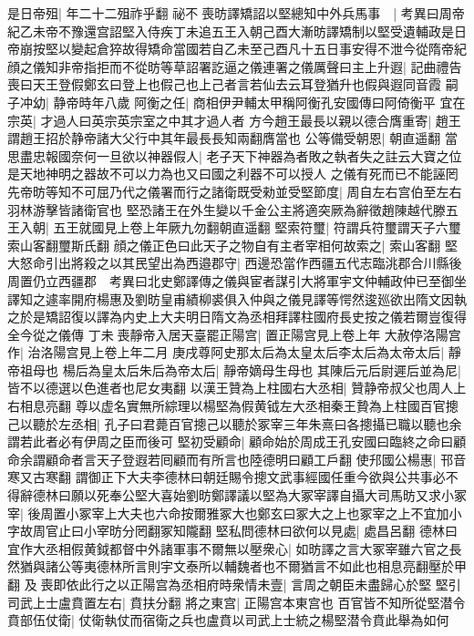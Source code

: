 是日帝殂|{
	年二十二殂祚乎翻}
祕不喪昉譯矯詔以堅總知中外兵馬事　|{
	考異曰周帝紀乙未帝不豫還宫詔堅入侍疾丁未追五王入朝己酉大漸昉譯矯制以堅受遺輔政是日帝崩按堅以變起倉猝故得矯命當國若自乙未至己酉凡十五日事安得不泄今從隋帝紀}
顔之儀知非帝指拒而不從昉等草詔署訖逼之儀連署之儀厲聲曰主上升遐|{
	記曲禮告喪曰天王登假鄭玄曰登上也假己也上己者言若仙去云耳登猶升也假與遐同音霞}
嗣子冲幼|{
	静帝時年八歲}
阿衡之任|{
	商相伊尹輔太甲稱阿衡孔安國傳曰阿倚衡平}
宜在宗英|{
	才過人曰英宗英宗室之中其才過人者}
方今趙王最長以親以德合膺重寄|{
	趙王謂趙王招於静帝諸大父行中其年最長長知兩翻膺當也}
公等備受朝恩|{
	朝直遥翻}
當思盡忠報國奈何一旦欲以神器假人|{
	老子天下神器為者敗之執者失之註云大寶之位是天地神明之器故不可以力為也又曰國之利器不可以授人}
之儀有死而已不能誣罔先帝昉等知不可屈乃代之儀署而行之諸衛既受勑並受堅節度|{
	周自左右宫伯至左右羽林游擊皆諸衛官也}
堅恐諸王在外生變以千金公主將適突厥為辭徵趙陳越代滕五王入朝|{
	五王就國見上卷上年厥九勿翻朝直遥翻}
堅索符璽|{
	符謂兵符璽謂天子六璽索山客翻璽斯氏翻}
顔之儀正色曰此天子之物自有主者宰相何故索之|{
	索山客翻}
堅大怒命引出將殺之以其民望出為西邉郡守|{
	西邊恐當作西疆五代志臨洮郡合川縣後周置仍立西疆郡　考異曰北史鄭譯傳之儀與宦者謀引大將軍宇文仲輔政仲已至御坐譯知之遽率開府楊惠及劉昉皇甫績柳裘俱入仲與之儀見譯等愕然逡廵欲出隋文因執之於是矯詔復以譯為内史上大夫明日隋文為丞相拜譯柱國府長史按之儀若爾豈復得全今從之儀傳}
丁未喪靜帝入居天臺罷正陽宫|{
	置正陽宫見上卷上年}
大赦停洛陽宫作|{
	治洛陽宫見上卷上年二月}
庚戌尊阿史那太后為太皇太后李太后為太帝太后|{
	靜帝祖母也}
楊后為皇太后朱后為帝太后|{
	靜帝嫡母生母也}
其陳后元后尉遲后並為尼|{
	皆不以德選以色進者也尼女夷翻}
以漢王贊為上柱國右大丞相|{
	贊静帝叔父也周人上右相息亮翻}
尊以虚名實無所綜理以楊堅為假黄钺左大丞相秦王贄為上柱國百官摠己以聽於左丞相|{
	孔子曰君薨百官摠己以聽於冢宰三年朱熹曰各摠攝已職以聽也余謂若此者必有伊周之臣而後可}
堅初受顧命|{
	顧命始於周成王孔安國曰臨終之命曰顧命余謂顧命者言天子登遐若囘顧而有所言也陸德明曰顧工戶翻}
使䢴國公楊惠|{
	邗音寒又古寒翻}
謂御正下大夫李德林曰朝廷賜令摠文武事經國任重今欲與公共事必不得辭德林曰願以死奉公堅大喜始劉昉鄭譯議以堅為大冢宰譯自攝大司馬昉又求小冢宰|{
	後周置小冢宰上大夫也六命按爾雅冢大也鄭玄曰冢大之上也冢宰之上不宜加小字故周官止曰小宰昉分罔翻冢知隴翻}
堅私問德林曰欲何以見處|{
	處昌呂翻}
德林曰宜作大丞相假黄鉞都督中外諸軍事不爾無以壓衆心|{
	如昉譯之言大冢宰雖六官之長然猶與諸公等夷德林所言則宇文泰所以輔魏者也不爾猶言不如此也相息亮翻壓於甲翻}
及喪即依此行之以正陽宫為丞相府時衆情未壹|{
	言周之朝臣未盡歸心於堅}
堅引司武上士盧賁置左右|{
	賁扶分翻}
將之東宫|{
	正陽宫本東宫也}
百官皆不知所從堅潜令賁部伍仗衛|{
	仗衛執仗而宿衛之兵也盧賁以司武上士統之楊堅潜令賁此舉為如何}
